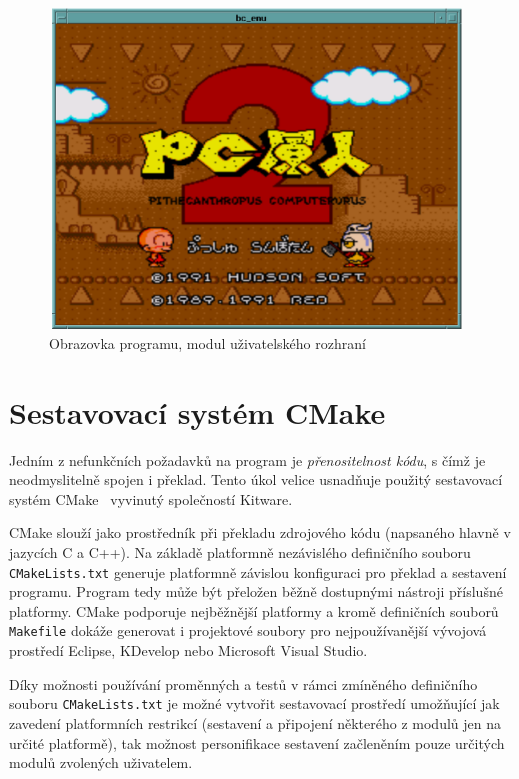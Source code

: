 \begin{figure}[ht]
\begin{center}
\includegraphics[width=11cm,height=8.5cm]{fig/impl_sdlgl}
\caption{Obrazovka programu, modul uživatelského rozhraní
	\label{fig:impl_sdlgl}}
\end{center}
\end{figure}


\section{Sestavovací systém CMake}\label{chap:impl_cmake}

Jedním z nefunkčních požadavků na program je {\em přenositelnost kódu}, s čímž
je neodmyslitelně spojen i překlad. Tento úkol velice usnadňuje použitý
sestavovací systém CMake~\cite{wwwCMake} vyvinutý společností Kitware.

CMake slouží jako prostředník při překladu zdrojového kódu (napsaného hlavně v
jazycích C a C++). Na základě platformně nezávislého definičního souboru {\tt
CMakeLists.txt} generuje platformně závislou konfiguraci pro překlad a
sestavení programu. Program tedy může být přeložen běžně dostupnými nástroji
příslušné platformy. CMake podporuje nejběžnější platformy a kromě
definičních souborů {\tt Makefile} dokáže generovat i projektové soubory pro
nejpoužívanější vývojová prostředí Eclipse, KDevelop nebo Microsoft Visual
Studio.

Díky možnosti používání proměnných a testů v rámci zmíněného definičního
souboru {\tt CMakeLists.txt} je možné vytvořit sestavovací prostředí umožňující
jak zavedení platformních restrikcí (sestavení a připojení některého z modulů
jen na určité platformě), tak možnost personifikace sestavení začleněním pouze
určitých modulů zvolených uživatelem.

